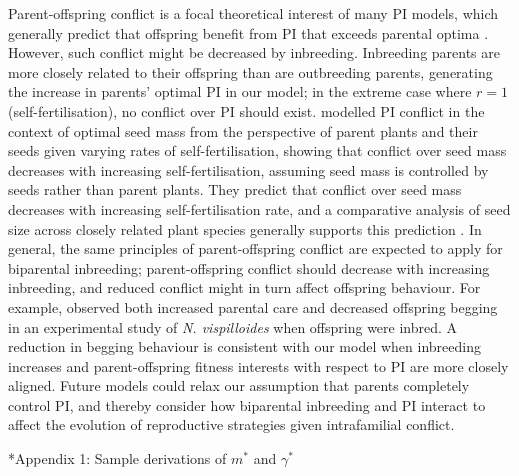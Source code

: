 \documentclass[12pt]{article}
\makeatletter
\renewcommand\section{\@startsection{section}{1}{0in}{-0.5\baselineskip}{0.1\baselineskip}{\normalfont\large\bfseries}}
\makeatother
\begin{document}
Parent-offspring conflict is a focal theoretical interest of many PI models, which generally predict that offspring benefit from PI that exceeds parental optima \cite[e.g.,][]{Macnair1978, Parker1978, Parker1985, DeJong2005}. However, such conflict might be decreased by inbreeding. Inbreeding parents are more closely related to their offspring than are outbreeding parents, generating the increase in parents' optimal PI in our model; in the extreme case where $r=1$ (self-fertilisation), no conflict over PI should exist. \cite{DeJong2005} modelled PI conflict in the context of optimal seed mass from the perspective of parent plants and their seeds given varying rates of self-fertilisation, showing that conflict over seed mass decreases with increasing self-fertilisation, assuming seed mass is controlled by seeds rather than parent plants. They predict that conflict over seed mass decreases with increasing self-fertilisation rate, and a comparative analysis of seed size across closely related plant species generally supports this prediction \cite[][]{DeJong2005}. In general, the same principles of parent-offspring conflict are expected to apply for biparental inbreeding; parent-offspring conflict should decrease with increasing inbreeding, and reduced conflict might in turn affect offspring behaviour. For example, \cite{Mattey2014} observed both increased parental care and decreased offspring begging in an experimental study of \textit{N. vispilloides} when offspring were inbred. A reduction in begging behaviour is consistent with our model when inbreeding increases and parent-offspring fitness interests with respect to PI are more closely aligned. Future models could relax our assumption that parents completely control PI, and thereby consider how biparental inbreeding and PI interact to affect the evolution of reproductive strategies given intrafamilial conflict.

\section*{Appendix 1: Sample derivations of $m^{*}$ and $\gamma^{*}$}
\end{document}
